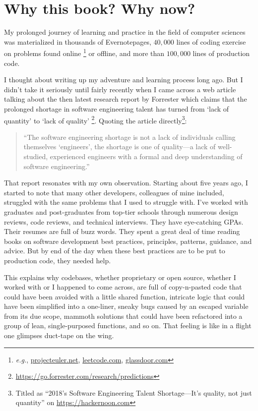 \section{Why this book?
Why now?}\label{sec:whyThisBook}

My prolonged journey of learning and practice in the field of computer sciences was
materialized in thousands of Evernote\textregistered pages, $40,000$
lines of coding exercise on problems found online \footnote{\textit{e.g.},
\url{projecteuler.net}, \url{leetcode.com}, \url{glassdoor.com}} or offline,
and more than $100,000$ lines of production code.

I thought about writing up my adventure and learning process long ago.
But I didn't take it seriously until fairly recently when
I came across a web article talking about the then latest research report by Forrester
which claims that the prolonged shortage in software engineering talent has turned from
`lack of quantity' to `lack of quality'
\footnote{\url{https://go.forrester.com/research/predictions}}.
Quoting the article directly\footnote{Titled as ``2018's Software Engineering Talent
Shortage---It's quality, not just quantity'' on \url{https://hackernoon.com}}:
\begin{quote}
    ``The software engineering shortage is not a lack of individuals calling
    themselves `engineers', the shortage is one of quality---a lack of well-studied,
    experienced engineers with a formal and deep understanding of software engineering.''
\end{quote}


That report resonates with my own observation.
Starting about five years ago,
I started to note that many other developers, colleagues of mine included,
struggled with the same problems that I used to struggle with.
I've worked with graduates and post-graduates from top-tier schools
through numerous design reviews, code reviews, and technical interviews.
They have eye-catching GPAs.
Their resumes are full of buzz words.
They spent a great deal of time reading books on software development best practices, principles,
patterns, guidance, and advice.
But by end of the day when these best practices are to be put to production code, they
needed help.


This explains why codebases, whether proprietary or open source, whether I worked with or I
happened to come across,
are full of copy-n-pasted code that could have been avoided with a little shared function,
intricate logic that could have been simplified into a one-liner,
sneaky bugs caused by an escaped variable from its due scope,
mammoth solutions that could have been refactored into a group of lean, single-purposed functions,
and so on.
That feeling is like in a flight one glimpses duct-tape on the wing.


